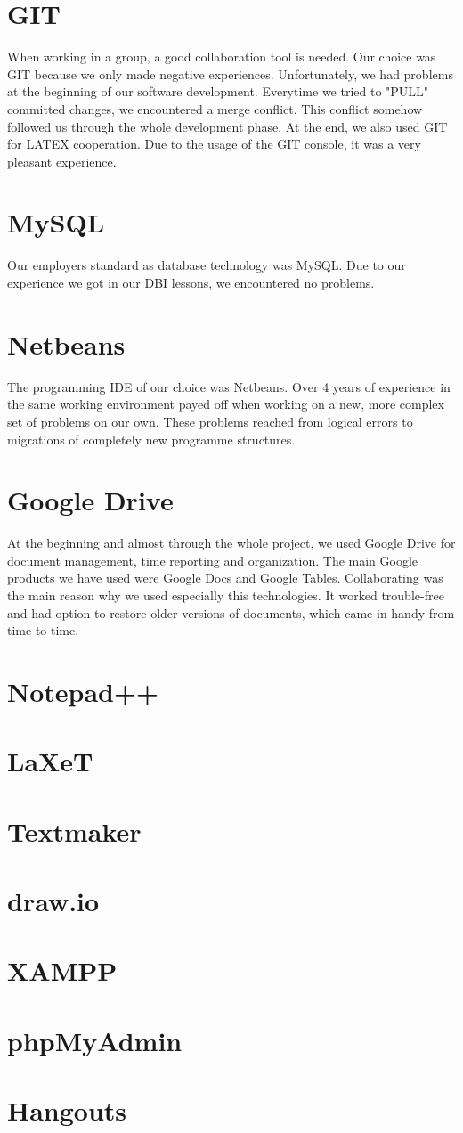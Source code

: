 \section{GIT}
When working in a group, a good collaboration tool is needed. Our choice was GIT because we only made negative experiences.\newline
Unfortunately, we had problems at the beginning of our software development. Everytime we tried to "PULL" committed changes, we encountered a merge conflict. This conflict somehow followed us through the whole development phase.\newline
At the end, we also used GIT for LATEX cooperation. Due to the usage of the GIT console, it was a very pleasant experience.
\section{MySQL}
Our employers standard as database technology was MySQL. Due to our experience we got in our DBI lessons, we encountered no problems.
\section{Netbeans}
The programming IDE of our choice was Netbeans. Over 4 years of experience in the same working environment payed off when working on a new, more complex set of problems on our own. These problems reached from logical errors to migrations of completely new programme structures. 
\section{Google Drive}
At the beginning and almost through the whole project, we used Google Drive for document management, time reporting and organization.\newline
The main Google products we have used were Google Docs and Google Tables.\newline
Collaborating was the main reason why we used especially this technologies. It worked trouble-free and had option to restore older versions of documents, which came in handy from time to time.
\section{Notepad++}

\section{LaXeT}

\section{Textmaker}

\section{draw.io}

\section{XAMPP}

\section{phpMyAdmin}

\section{Hangouts}
